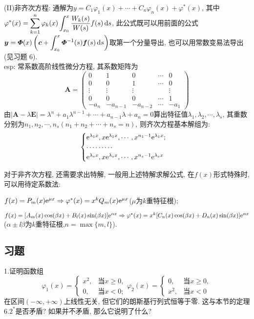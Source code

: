 (II)非齐次方程: 通解为$y=C_1\varphi_1(x)+\cdots+C_n\varphi_n(x)+\varphi^*(x)$, 其中$\displaystyle\varphi^*(x)=\sum_{k=1}^n\varphi_k(x)\int_{x_0}^x\frac{W_k(s)}{W(s)}f(s)\,\mathrm{d} s$, 此公式既可以用前面的公式$\displaystyle\bm{y}=\bm{\varPhi}(x)\left(\bm{c}+\int_{x_0}^x\bm{\varPhi}^{-1}(s)\bm{f}(s)\,\mathrm{d} s\right)$取第一个分量导出, 也可以用常数变易法导出(见习题 6).\\
esp: 常系数高阶线性微分方程, 其系数矩阵为
\[\bm{A}=\begin{pmatrix}0&1&0&\cdots&0\\0&0&1&\cdots&0\\
\vdots&\vdots&\vdots&&\vdots\\0&0&0&\cdots&1\\-a_n&-a_{n-1}&-a_{n-2}&\cdots&-a_1\end{pmatrix}\]
由$|\bm{A}-\lambda\bm{E}|=\lambda^n+a_1\lambda^{n-1}+\cdots+a_{n-1}\lambda+a_n=0$算出特征值$\lambda_1,\lambda_2,\cdots,\lambda_s$, 其重数分别为$n_1,n_2,\cdots,n_s(n_1+n_2+\cdots+n_s=n)$, 则齐次方程基本解组为:
\[\begin{cases}
\mathrm{e}^{\lambda_1x},x\mathrm{e}^{\lambda_1x},\cdots,x^{n_1-1}\mathrm{e}^{\lambda_1x};\\
\cdots\cdots\cdots\\
\mathrm{e}^{\lambda_sx},x\mathrm{e}^{\lambda_sx},\cdots,x^{n_s-1}\mathrm{e}^{\lambda_sx}
\end{cases}\]

对于非齐次方程, 还需要求出特解, 一般用上述特解求解公式, 在$f(x)$形式特殊时, 可以用待定系数法:

$f(x)=P_m(x)\mathrm{e}^{\mu x}\Rightarrow\varphi^*(x)=x^kQ_m(x)\mathrm{e}^{\mu x}$($\mu$为$k$重特征根);

$f(x)=[A_m(x)\cos(\beta x)+B_l(x)\sin(\beta x)]\mathrm{e}^{\alpha x}\Rightarrow\varphi^*(x)=x^k[C_n(x)\cos(\beta x)+D_n(x)\sin(\beta x)]\mathrm{e}^{\alpha x}$($\alpha\pm\ii\beta$为$k$重特征根,$n=\max\{m,l\}$).


\subsection{习题}


1.证明函数组
\[\varphi_1(x)=\begin{cases}x^2,&\mbox{当}x\geq0,\\0,&\mbox{当}x<0;\end{cases}\varphi_2(x)=\begin{cases}0,&\mbox{当}x\geq0,\\x^2,&\mbox{当}x<0\end{cases}\]
在区间$(-\infty,+\infty)$上线性无关, 但它们的朗斯基行列式恒等于零. 这与本节的定理$6.2^*$是否矛盾? 如果并不矛盾, 那么它说明了什么?

